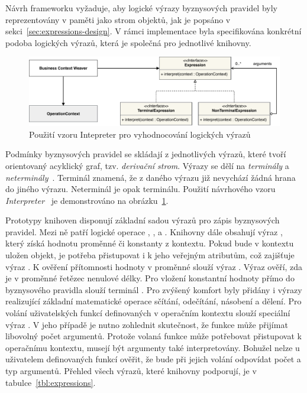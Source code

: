Návrh frameworku vyžaduje, aby logické výrazy byznysových pravidel byly reprezentovány
v paměti jako strom objektů, jak je popsáno v sekci~\ref{sec:expressions-design}.
V rámci implementace byla specifikována konkrétní podoba logických výrazů, která je společná
pro jednotlivé knihovny.

\begin{figure}
    \centering
    \includegraphics[keepaspectratio=true, width=1\linewidth]{figures/expression.pdf}
    \caption{Použití vzoru Intepreter pro vyhodnocování logických výrazů}
    \label{fig:expression}
\end{figure}

Podmínky byznysových pravidel se skládají z jednotlivých výrazů, které tvoří
orientovaný acyklický graf, tzv. \textit{derivační strom}.
Výrazy se dělí na \textit{terminály} a \textit{neterminály}~\cite{melichar2003jazyky}.
Terminál znamená, že z daného výrazu již nevychází žádná hrana do jiného výrazu.
Neterminál je opak terminálu. Použití návrhového vzoru \textit{Interpreter}~\cite{fowler2002patterns}
je demonstrováno na obrázku~\ref{fig:expression}.

Prototypy knihoven disponují základní sadou výrazů pro zápis byznysových pravidel.
Mezi ně patří logické operace , ,  a .
Knihovny dále obsahují výraz , který získá hodnotu proměnné či
konstanty z kontextu. Pokud bude v kontextu uložen objekt, je potřeba přistupovat i k jeho
veřejným atributům, což zajišťuje výraz .
K ověření přítomnosti hodnoty v proměnné slouží výraz . Výraz  ověří,
zda je v proměnné řetězec nenulové délky. Pro vložení konstantní hodnoty přímo do byznysového pravidla
slouží terminál . Pro zvýšený komfort byly přidány i výrazy realizující základní matematické operace
sčítání, odečítání, násobení a dělení. Pro volání uživatelských funkcí definovaných v operačním kontextu slouží speciální výraz
. V jeho případě je nutno zohlednit skutečnost, že funkce může přijímat libovolný počet argumentů.
Protože volaná funkce může potřebovat přistupovat k operačnímu kontextu, musejí být argumenty také interpretovány.
Bohužel nelze u uživatelem definovaných funkcí ověřit, že bude při jejich volání odpovídat počet a typ argumentů.
Přehled všech výrazů, které knihovny podporují, je v tabulce~\ref{tbl:expressions}.

